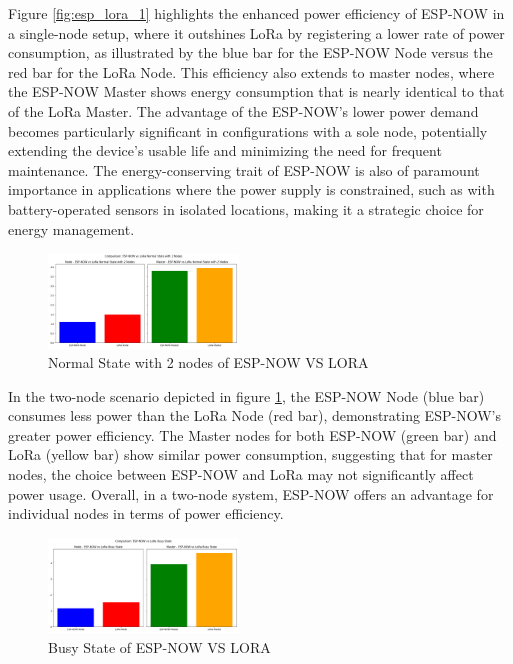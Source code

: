 Figure \ref{fig:esp_lora_1} highlights the enhanced power efficiency of ESP-NOW in a single-node setup, where it outshines LoRa by registering a lower rate of power consumption, as illustrated by the blue bar for the ESP-NOW Node versus the red bar for the LoRa Node. This efficiency also extends to master nodes, where the ESP-NOW Master shows energy consumption that is nearly identical to that of the LoRa Master. The advantage of the ESP-NOW's lower power demand becomes particularly significant in configurations with a sole node, potentially extending the device's usable life and minimizing the need for frequent maintenance. The energy-conserving trait of ESP-NOW is also of paramount importance in applications where the power supply is constrained, such as with battery-operated sensors in isolated locations, making it a strategic choice for energy management.

\begin{figure}[H]
  \begin{center}
    \includegraphics[width=0.45\textwidth]{./Figures/Average_Power_Consumption/ESP-NOW_vs_LORA_Normal_2_nodes.png}
  \end{center}
  \caption{Normal State with 2 nodes of ESP-NOW VS LORA}\label{fig:esp_lora_2}
\end{figure}

In the two-node scenario depicted in figure \ref{fig:esp_lora_2}, the ESP-NOW Node (blue bar) consumes less power than the LoRa Node (red bar), demonstrating ESP-NOW’s greater power efficiency. The Master nodes for both ESP-NOW (green bar) and LoRa (yellow bar) show similar power consumption, suggesting that for master nodes, the choice between ESP-NOW and LoRa may not significantly affect power usage. Overall, in a two-node system, ESP-NOW offers an advantage for individual nodes in terms of power efficiency.

\begin{figure}[H]
  \begin{center}
    \includegraphics[width=0.45\textwidth]{./Figures/Average_Power_Consumption/ESP-NOW_vs_LORA_Busy.png}
  \end{center}
  \caption{Busy State of ESP-NOW VS LORA}\label{fig:esp_lora_busy}
\end{figure}

